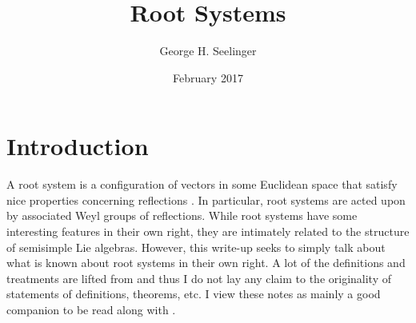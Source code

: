 \documentclass[11pt,leqno,oneside]{amsart}
\title[Root Systems]{Root Systems}
\author{George H. Seelinger}
\date{February 2017}
\numberwithin{thm}{section}
\begin{document}
\maketitle
\section{Introduction}
A root system is a configuration of vectors in some Euclidean space
that satisfy nice properties concerning reflections \cite{wiki}. In particular,
root systems are acted upon by associated Weyl groups of
reflections. While root systems have some interesting features in
their own right, they are intimately related to the structure of
semisimple Lie algebras. However, this write-up seeks to simply talk
about what is known about root systems in their own right. A lot of
the definitions and treatments are lifted from \cite{humph} and thus
I do not lay any claim to the originality of statements of
definitions, theorems, etc. I view these notes as mainly a good
companion to be read along with \cite{humph}.
\end{document}
